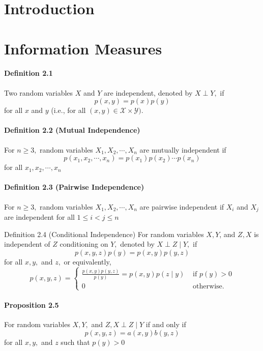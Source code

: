 \documentclass[8pt]{article}
\begin{document}
\section{Introduction}
\section{Information Measures}
\paragraph{Definition 2.1} Two random variables $X$ and $Y$ are independent, denoted by $X \perp Y,$ if
$$
p(x, y)=p(x) p(y)
$$
for all $x$ and $y$ (i.e., for all $(x, y) \in \mathcal{X} \times \mathcal{Y})$.

\paragraph{Definition 2.2 (Mutual Independence)} For $n \geq 3,$ random variables $X_{1}, X_{2}, \cdots, X_{n}$ are mutually independent if
$$
p\left(x_{1}, x_{2}, \cdots, x_{n}\right)=p\left(x_{1}\right) p\left(x_{2}\right) \cdots p\left(x_{n}\right)
$$
for all $x_{1}, x_{2}, \cdots, x_{n}$

\paragraph{Definition 2.3 (Pairwise Independence)} For $n \geq 3,$ random variables $X_{1}, X_{2}, \cdots, X_{n}$ are pairwise independent if $X_{i}$ and $X_{j}$ are independent for all $1 \leq i<j \leq n$

Definition 2.4 (Conditional Independence) For random variables $X, Y$, and $Z, X$ is independent of $Z$ conditioning on $Y,$ denoted by $X \perp Z \mid Y,$ if
$$
p(x, y, z) p(y)=p(x, y) p(y, z)
$$
for all $x, y,$ and $z,$ or equivalently,
$$
p(x, y, z)=\left\{\begin{array}{ll}
\frac{p(x, y) p(y, z)}{p(y)}=p(x, y) p(z \mid y) & \text { if } p(y)>0 \\
0 & \text { otherwise. }
\end{array}\right.
$$

\paragraph{Proposition 2.5} For random variables $X, Y,$ and $Z, X \perp Z \mid Y$ if and only if
$$
p(x, y, z)=a(x, y) b(y, z)
$$
for all $x, y,$ and $z$ such that $p(y)>0$
\end{document}
